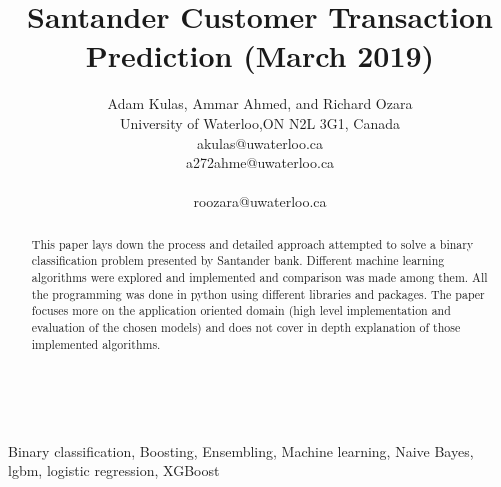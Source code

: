 \documentclass[journal,twoside,web]{ieeecolor}
\begin{document}
\title{Santander Customer Transaction Prediction (March 2019)}\\

\author{Adam Kulas, Ammar Ahmed, and Richard Ozara\\
\institute University of Waterloo,ON N2L 3G1, Canada\\akulas@uwaterloo.ca\\
a272ahme@uwaterloo.ca \\\centerline{roozara@uwaterloo.ca}}

\maketitle



\begin{abstract}
This paper lays down the process and detailed approach attempted to solve a binary classification problem presented by Santander bank. Different machine learning algorithms were explored and implemented and comparison was made among them. All the programming was done in python using different libraries and packages. The paper focuses more on the application oriented domain (high level implementation and evaluation of the chosen models) and does not cover in depth explanation of those implemented algorithms. 

\end{abstract}

\begin{IEEEkeywords}
Binary classification, Boosting, Ensembling, Machine learning, Naive Bayes, lgbm, logistic regression, XGBoost

\end{IEEEkeywords}
\end{document}
